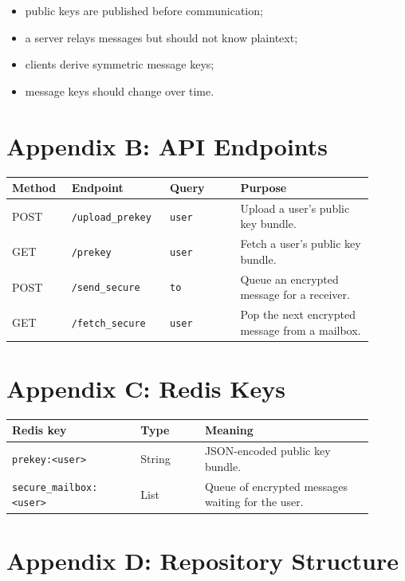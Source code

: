 \documentclass[12pt,a4paper]{article}
\begin{document}
\begin{itemize}
    \item public keys are published before communication;
    \item a server relays messages but should not know plaintext;
    \item clients derive symmetric message keys;
    \item message keys should change over time.
\end{itemize}

\section{Appendix B: API Endpoints}

\begin{longtable}{p{0.14\linewidth} p{0.24\linewidth} p{0.18\linewidth} p{0.34\linewidth}}
\toprule
\textbf{Method} & \textbf{Endpoint} & \textbf{Query} & \textbf{Purpose} \\
\midrule
POST & \texttt{/upload\_prekey} & \texttt{user} & Upload a user's public key bundle. \\
GET & \texttt{/prekey} & \texttt{user} & Fetch a user's public key bundle. \\
POST & \texttt{/send\_secure} & \texttt{to} & Queue an encrypted message for a receiver. \\
GET & \texttt{/fetch\_secure} & \texttt{user} & Pop the next encrypted message from a mailbox. \\
\bottomrule
\end{longtable}

\section{Appendix C: Redis Keys}

\begin{longtable}{p{0.32\linewidth} p{0.16\linewidth} p{0.42\linewidth}}
\toprule
\textbf{Redis key} & \textbf{Type} & \textbf{Meaning} \\
\midrule
\texttt{prekey:<user>} & String & JSON-encoded public key bundle. \\
\texttt{secure\_mailbox:<user>} & List & Queue of encrypted messages waiting for the user. \\
\bottomrule
\end{longtable}

\section{Appendix D: Repository Structure}
\end{document}
